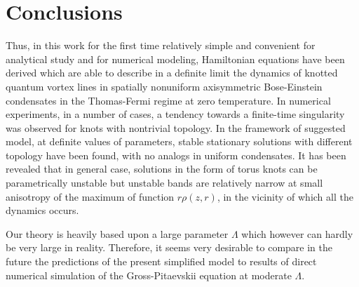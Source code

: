 \documentclass[pra,twocolumn,showpacs]{revtex4}
\begin{document}
\section{Conclusions}

Thus, in this work for the first time relatively simple and convenient for analytical study and 
for numerical modeling, Hamiltonian equations have been derived which are able to describe in 
a definite limit the dynamics of knotted quantum vortex lines in spatially nonuniform axisymmetric 
Bose-Einstein condensates in the Thomas-Fermi regime at zero temperature. In numerical experiments,
in a number of cases, a tendency towards a finite-time singularity was observed for knots with 
nontrivial topology. In the framework of suggested model, at definite values of parameters, stable
stationary solutions with different topology have been found, with no analogs in uniform condensates.
It has been revealed that in general case, solutions in the form of torus knots can be parametrically
unstable but unstable bands are relatively narrow at small anisotropy of the maximum of function
$r\rho(z,r)$, in the vicinity of which all the dynamics occurs.

Our theory is heavily based upon a large parameter $\Lambda$ which however can hardly be very large 
in reality. Therefore, it seems very desirable to compare in the future the predictions of the present 
simplified model to results of direct numerical simulation of the Gross-Pitaevskii equation at 
moderate $\Lambda$.


\vspace{4mm}
\end{document}
